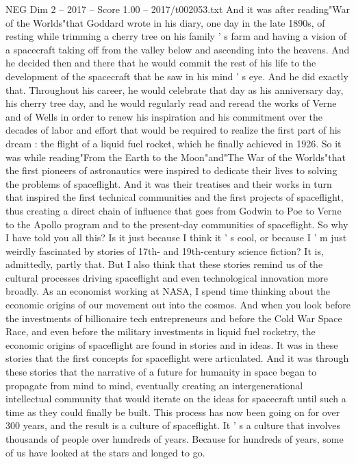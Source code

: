 \begin{textsample}{NEG Dim 2 – 2017 – Score 1.00 – 2017/t002053.txt}
And it was after reading"War of the Worlds"that Goddard wrote in his diary, one day in the late 1890s, of resting while trimming a cherry tree on his family ' s farm and having a vision of a spacecraft taking off from the valley below and ascending into the heavens.
And he decided then and there that he would commit the rest of his life to the development of the spacecraft that he saw in his mind ' s eye.
And he did exactly that.
Throughout his career, he would celebrate that day as his anniversary day, his cherry tree day, and he would regularly read and reread the works of Verne and of Wells in order to renew his inspiration and his commitment over the decades of labor and effort that would be required to realize the first part of his dream : the flight of a liquid fuel rocket, which he finally achieved in 1926.
So it was while reading"From the Earth to the Moon"and"The War of the Worlds"that the first pioneers of astronautics were inspired to dedicate their lives to solving the problems of spaceflight.
And it was their treatises and their works in turn that inspired the first technical communities and the first projects of spaceflight, thus creating a direct chain of influence that goes from Godwin to Poe to Verne to the Apollo program and to the present-day communities of spaceflight.
So why I have told you all this?
Is it just because I think it ' s cool, or because I ' m just weirdly fascinated by stories of 17th- and 19th-century science fiction?
It is, admittedly, partly that.
But I also think that these stories remind us of the cultural processes driving spaceflight and even technological innovation more broadly.
As an economist working at NASA, I spend time thinking about the economic origins of our movement out into the cosmos.
And when you look before the investments of billionaire tech entrepreneurs and before the Cold War Space Race, and even before the military investments in liquid fuel rocketry, the economic origins of spaceflight are found in stories and in ideas.
It was in these stories that the first concepts for spaceflight were articulated.
And it was through these stories that the narrative of a future for humanity in space began to propagate from mind to mind, eventually creating an intergenerational intellectual community that would iterate on the ideas for spacecraft until such a time as they could finally be built.
This process has now been going on for over 300 years, and the result is a culture of spaceflight.
It ' s a culture that involves thousands of people over hundreds of years.
Because for hundreds of years, some of us have looked at the stars and longed to go.

\end{textsample}
